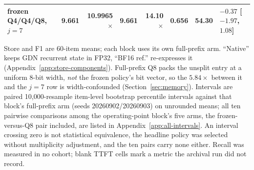 \begin{table}[H]
\begin{tabular}{@{}lrrrrrrl@{}}
\qcomem{} frozen Q4/Q4/Q8, $j=7$ & 9.661 & 10.9965$\times$ & 9.661 & 14.10$\times$ & 0.656 & 54.30 & $-0.37$ [$-1.97$, $1.08$] \\
\bottomrule
\end{tabular}
\vspace{0.5mm}
\parbox{0.97\textwidth}{\scriptsize Store and F1 are 60-item means; each block uses its own full-prefix arm.
``Native'' keeps GDN recurrent state in FP32, ``BF16 ref.'' re-expresses it
(Appendix~\ref{app:store-components}).  Full-prefix Q8 packs the
unsplit entry at a uniform 8-bit width, \emph{not} the frozen policy's bit
vector, so the $5.84\times$ between it and the $j=7$ row is width-confounded
(Section~\ref{sec:memory}).  Intervals are paired
10,000-resample item-level bootstrap percentile intervals against that block's
full-prefix arm (seeds 20260902/20260903) on unrounded means; all ten pairwise
comparisons among the operating-point block's five arms, the frozen-versus-Q8
pair included, are listed in Appendix~\ref{app:all-intervals}.  An interval
crossing zero is not statistical equivalence, the headline policy was selected
without multiplicity adjustment, and the ten pairs carry none either.  Recall was
measured in no cohort; blank TTFT cells mark a metric the archival run did not
record.}
\end{table}
